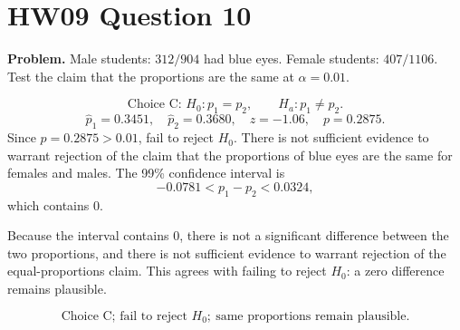 \documentclass[11pt]{article}
\begin{document}
\section*{HW09 Question 10}

\textbf{Problem.} Male students: \(312/904\) had blue eyes. Female students: \(407/1106\). Test the claim that the proportions are the same at \(\alpha=0.01\).

\[
\boxed{\text{Choice C: }H_0:p_1=p_2,\qquad H_a:p_1\ne p_2.}
\]
\[
\hat p_1=0.3451,\quad \hat p_2=0.3680,\quad z=-1.06,\quad p=0.2875.
\]
Since \(p=0.2875>0.01\), fail to reject \(H_0\). There is not sufficient evidence to warrant rejection of the claim that the proportions of blue eyes are the same for females and males. The 99\% confidence interval is
\[
-0.0781<p_1-p_2<0.0324,
\]
which contains 0.

Because the interval contains 0, there is not a significant difference between the two proportions, and there is not sufficient evidence to warrant rejection of the equal-proportions claim.
This agrees with failing to reject \(H_0\): a zero difference remains plausible.

\[
\boxed{\text{Choice C; fail to reject }H_0;\ \text{same proportions remain plausible.}}
\]
\end{document}
